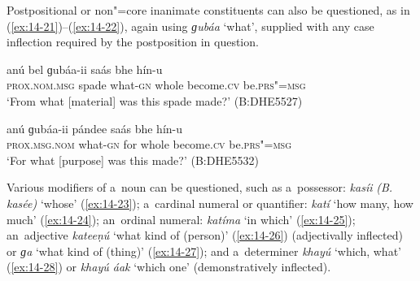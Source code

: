 Postpositional or non"=core inanimate constituents can also be questioned, as in (\ref{ex:14-21})--(\ref{ex:14-22}), again using \textit{ɡubáa} `what', supplied with any case inflection required by the postposition in question.

\begin{exe}
\ex
\label{ex:14-21}
\gll anú bel ɡubáa-ii saás bhe  hín-u  \\
\textsc{prox.nom.msg} spade what-\textsc{gn} whole become.\textsc{cv}  be.\textsc{prs"=msg} \\
\glt `From what [material] was this spade made?' (B:DHE5527)

\ex
\label{ex:14-22}
\gll anú ɡubáa-ii pándee saás bhe  hín-u \\
\textsc{prox.msg.nom} what-\textsc{gn} for whole become.\textsc{cv}  be.\textsc{prs"=msg} \\
\glt `For what [purpose] was this made?' (B:DHE5532)
\end{exe}

 Various modifiers of a~noun can be questioned,
such as a~possessor: \textit{kasíi} \textit{(B. kasée)} `whose' (\ref{ex:14-23});
a~cardinal numeral or quantifier: \textit{katí} `how many, how much' (\ref{ex:14-24});
an~ordinal numeral: \textit{katíma} `in which' (\ref{ex:14-25}); an~adjective
\textit{kateeṇú} `what kind of (person)' (\ref{ex:14-26}) (adjectivally inflected) or
\textit{ɡa} `what kind of (thing)' (\ref{ex:14-27}); and a~determiner \textit{khayú} `which,
what' (\ref{ex:14-28}) or \textit{khayú áak} `which one' (demonstratively inflected).

